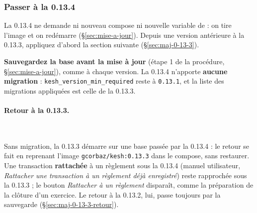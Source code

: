 \documentclass[a4paper,11pt,oneside]{article}
\begin{document}
\subsubsection{Passer à la 0.13.4}\label{sec:maj-0-13-4}

La 0.13.4 ne demande ni nouveau compose ni nouvelle variable de  : on tire l'image et on redémarre (\S\ref{sec:mise-a-jour}). Depuis une version antérieure à la 0.13.3, appliquez d'abord la section suivante (\S\ref{sec:maj-0-13-3}).

\begin{sloppypar}
\textbf{Sauvegardez la base avant la mise à jour} (étape 1 de la procédure, \S\ref{sec:mise-a-jour}), comme à chaque version. La 0.13.4 n'apporte \textbf{aucune migration} : \texttt{kesh\_version\_min\_required} reste à \texttt{0.13.1}, et la liste des migrations appliquées est celle de la 0.13.3.
\end{sloppypar}

\paragraph{Retour à la 0.13.3.}\label{sec:maj-0-13-4-retour}\mbox{}\\
\begin{sloppypar}
Sans migration, la 0.13.3 démarre sur une base passée par la 0.13.4 : le retour se fait en reprenant l'image \texttt{gcorbaz/kesh:0.13.3} dans le compose, sans restaurer. Une transaction \textbf{rattachée} à un règlement sous la 0.13.4 (manuel utilisateur, \emph{Rattacher une transaction à un règlement déjà enregistré}) reste rapprochée sous la 0.13.3 ; le bouton \emph{Rattacher à un règlement} disparaît, comme la préparation de la clôture d'un exercice. Le retour à la 0.13.2, lui, passe toujours par la sauvegarde (\S\ref{sec:maj-0-13-3-retour}).
\end{sloppypar}
\end{document}
